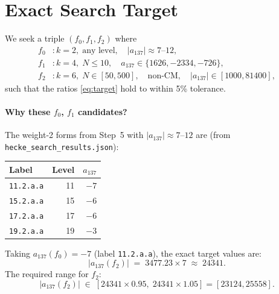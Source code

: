 \documentclass[12pt,a4paper]{article}
\theoremstyle{definition}
\theoremstyle{remark}
\begin{document}
\section{Exact Search Target}
\label{sec:target}

We seek a triple $(f_0, f_1, f_2)$ where
\begin{align}
  f_0 &: k=2,\; \text{any level}, \quad |a_{137}| \approx 7\text{--}12, \label{eq:f0}\\
  f_1 &: k=4,\; N \le 10,\quad a_{137} \in \{1626, -2334, -726\}, \label{eq:f1}\\
  f_2 &: k=6,\; N \in [50, 500],\quad \text{non-CM},\quad
        |a_{137}| \in [1000, 81400], \label{eq:f2}
\end{align}
such that the ratios \eqref{eq:target} hold to within 5\% tolerance.

\paragraph{Why these $f_0$, $f_1$ candidates?}
The weight-2 forms from Step~5 with $|a_{137}| \approx 7\text{--}12$ are
(from \texttt{hecke\_search\_results.json}):
\begin{center}
\begin{tabular}{lrr}
  \toprule
  Label & Level & $a_{137}$ \\
  \midrule
  \texttt{11.2.a.a} & 11 & $-7$ \\
  \texttt{15.2.a.a} & 15 & $-6$ \\
  \texttt{17.2.a.a} & 17 & $-6$ \\
  \texttt{19.2.a.a} & 19 & $-3$ \\
  \bottomrule
\end{tabular}
\end{center}
Taking $a_{137}(f_0) = -7$ (label \texttt{11.2.a.a}), the exact target values are:
\begin{equation}
  |a_{137}(f_2)| \;=\; 3477.23 \times 7 \;\approx\; 24341.
  \label{eq:exact_target}
\end{equation}
The required range for $f_2$:
\begin{equation}
  |a_{137}(f_2)| \;\in\; [24341 \times 0.95,\; 24341 \times 1.05] = [23124, 25558].
  \label{eq:f2_window}
\end{equation}

\end{document}
